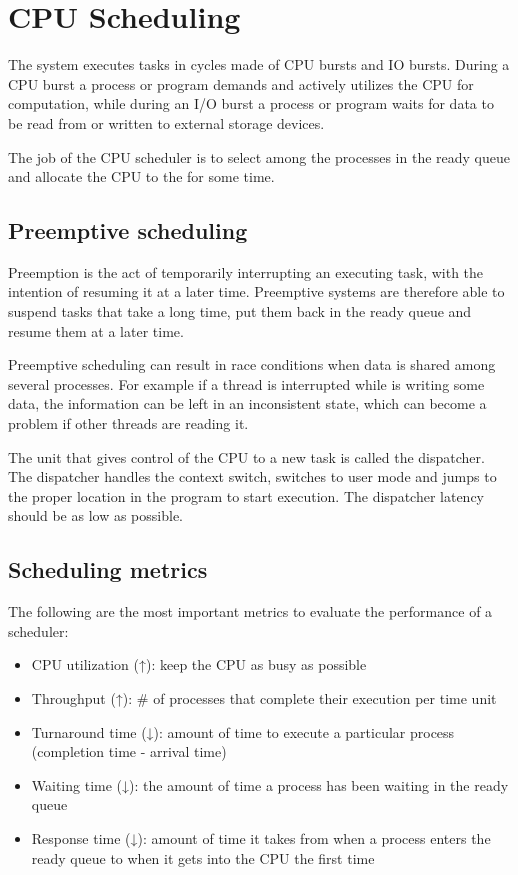 \chapter{CPU Scheduling}

The system executes tasks in cycles made of CPU bursts and IO bursts. During a CPU burst a process or program demands and actively utilizes the CPU for computation, while during an I/O burst a process or program waits for data to be read from or written to external storage devices.


The job of the CPU scheduler is to select among the processes in the ready queue and allocate the CPU to the for some time.

\section{Preemptive scheduling}
Preemption is the act of temporarily interrupting an executing task, with the intention of resuming it at a later time. Preemptive systems are therefore able to suspend tasks that take a long time, put them back in the ready queue and resume them at a later time. 

Preemptive scheduling can result in race conditions when data is shared among several processes. For example if a thread is interrupted while is writing some data, the information can be left in an inconsistent state, which can become a problem if other threads are reading it.

The unit that gives control of the CPU to a new task is called the dispatcher. The dispatcher handles the context switch, switches to user mode and jumps to the proper location in the program to start execution. The dispatcher latency should be as low as possible.

\section{Scheduling metrics}
The following are the most important metrics to evaluate the performance of a scheduler:
\begin{itemize}
    \item CPU utilization (↑): keep the CPU as busy as possible
    \item Throughput (↑): \# of processes that complete their execution per time unit
    \item Turnaround time (↓): amount of time to execute a particular process (completion time - arrival time)
    \item Waiting time (↓): the amount of time a process has been waiting in the ready queue
    \item Response time (↓): amount of time it takes from when a process enters the ready queue to when it gets into the CPU the first time
\end{itemize}

